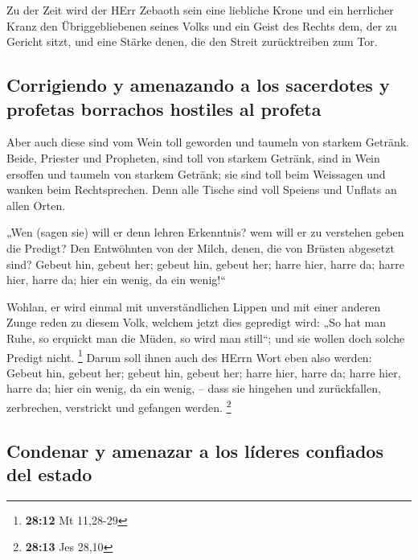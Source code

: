  Zu der Zeit wird der HErr Zebaoth sein eine liebliche
Krone und ein herrlicher Kranz den Übriggebliebenen seines Volks
 und ein Geist des Rechts dem, der zu Gericht sitzt, und
eine Stärke denen, die den Streit zurücktreiben zum Tor.

\hypertarget{corrigiendo-y-amenazando-a-los-sacerdotes-y-profetas-borrachos-hostiles-al-profeta}{%
\subsection{Corrigiendo y amenazando a los sacerdotes y profetas
borrachos hostiles al
profeta}\label{corrigiendo-y-amenazando-a-los-sacerdotes-y-profetas-borrachos-hostiles-al-profeta}}

 Aber auch diese sind vom Wein toll geworden und taumeln
von starkem Getränk. Beide, Priester und Propheten, sind toll von
starkem Getränk, sind in Wein ersoffen und taumeln von starkem Getränk;
sie sind toll beim Weissagen und wanken beim Rechtsprechen.
 Denn alle Tische sind voll Speiens und Unflats an allen
Orten.

 „Wen (sagen sie) will er denn lehren Erkenntnis? wem will
er zu verstehen geben die Predigt? Den Entwöhnten von der Milch, denen,
die von Brüsten abgesetzt sind?  Gebeut hin, gebeut her;
gebeut hin, gebeut her; harre hier, harre da; harre hier, harre da; hier
ein wenig, da ein wenig!{}``

 Wohlan, er wird einmal mit unverständlichen Lippen und
mit einer anderen Zunge reden zu diesem Volk, welchem jetzt dies
gepredigt wird:  „So hat man Ruhe, so erquickt man die
Müden, so wird man still``; und sie wollen doch solche Predigt nicht.
\footnote{\textbf{28:12} Mt 11,28-29}  Darum soll ihnen
auch des HErrn Wort eben also werden: Gebeut hin, gebeut her; gebeut
hin, gebeut her; harre hier, harre da; harre hier, harre da; hier ein
wenig, da ein wenig, -- dass sie hingehen und zurückfallen, zerbrechen,
verstrickt und gefangen werden. \footnote{\textbf{28:13} Jes 28,10}

\hypertarget{condenar-y-amenazar-a-los-luxedderes-confiados-del-estado}{%
\subsection{Condenar y amenazar a los líderes confiados del
estado}\label{condenar-y-amenazar-a-los-luxedderes-confiados-del-estado}}

